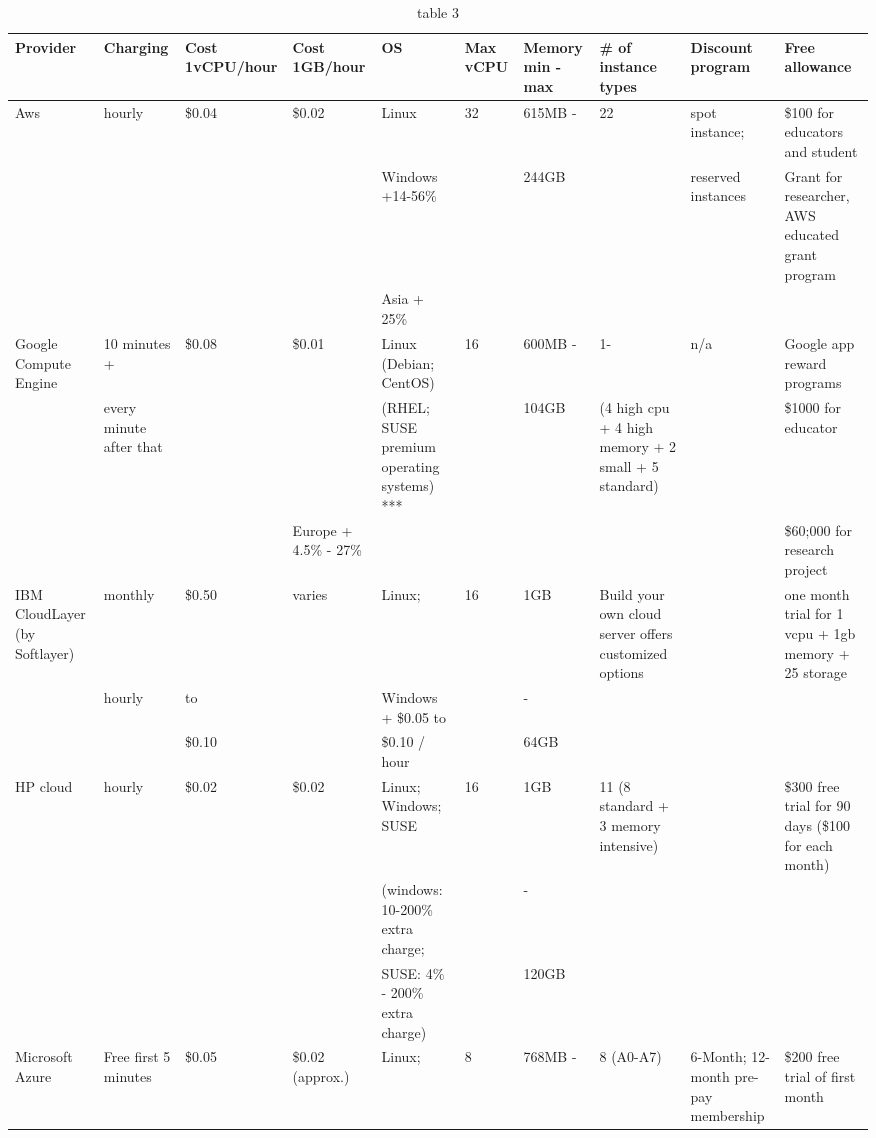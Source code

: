 \documentclass{sig-alternate}
\begin{document}
\begin{table}
\caption{table 3}\label{T:tab3}

\begin{small}
\begin{tabular}{|p{2cm}|p{2cm}|p{1.5cm}|p{1.5cm}|p{2cm}|p{1cm}|p{1.5cm}|p{2cm}|p{2cm}|p{2cm}|}
\hline
Provider & Charging & Cost 1vCPU/hour	   & Cost 1GB/hour & OS & Max vCPU & Memory min - max &\# of instance types & Discount program & Free allowance\\
\hline
\hline
Aws & hourly & \$0.04  & \$0.02  & Linux & 32 & 615MB - & 22 & spot instance;  & \$100 for educators and student\\
    &  	     &         &  	 & Windows +14-56\%   	&    & 244GB    &       & reserved instances & Grant for researcher, AWS educated grant program\\
    &  	     &         &  	 & Asia + 25\% 		&    & 		       &       &  	  	    & \\
\hline
Google Compute Engine & 10 minutes + & \$0.08  & \$0.01  & Linux (Debian; CentOS) & 16 & 600MB - & 1- & n/a & Google app reward programs\\
 & every minute after that &  &  & (RHEL; SUSE premium operating systems) *** &  & 104GB & (4 high cpu + 4 high memory + 2 small + 5 standard) &  & \$1000 for educator\\
 &  &  & Europe + 4.5\% - 27\%  &  &  &  &  &  & \$60;000 for research project\\
\hline 
IBM CloudLayer (by Softlayer) & monthly & \$0.50  & varies & Linux;  & 16 & 1GB  & Build your own cloud server offers customized options &  & one month trial for 1 vcpu + 1gb memory + 25 storage\\
\hline
 & hourly & to &  & Windows + \$0.05 to &  & -  &  &  & \\
 &  & \$0.10  &  &               \$0.10 / hour &  & 64GB &  &  & \\
\hline 
HP cloud & hourly & \$0.02  & \$0.02  & Linux; Windows; SUSE & 16 & 1GB  & 11 (8 standard + 3 memory intensive) &  & \$300 free trial for 90 days (\$100 for each month)\\
 &  &  &  & (windows: 10-200\% extra charge; &  & -  &  &  & \\
 &  &  &  & SUSE: 4\% - 200\% extra charge) &  & 120GB &  &  & \\
\hline 
Microsoft Azure & Free first 5 minutes & \$0.05  & \$0.02 (approx.) & Linux;  & 8 & 768MB -  & 8 (A0-A7) & 6-Month; 12-month pre-pay membership & \$200 free trial of first month\\

\end{tabular}
\end{small}
\end{table}
\end{document}

